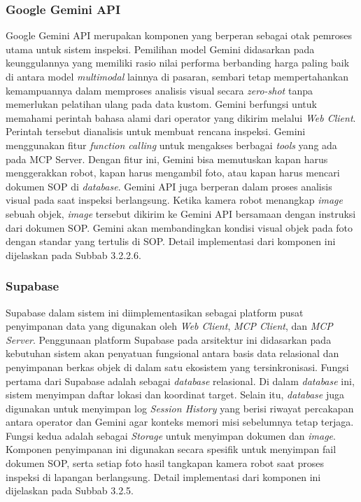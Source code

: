 \subsubsection{Google Gemini API}
Google Gemini API merupakan komponen yang berperan sebagai otak pemroses utama untuk sistem inspeksi. Pemilihan model Gemini didasarkan pada keunggulannya yang memiliki rasio nilai performa berbanding harga paling baik di antara model \textit{multimodal} lainnya di pasaran, sembari tetap mempertahankan kemampuannya dalam memproses analisis visual secara \textit{zero-shot} tanpa memerlukan pelatihan ulang pada data kustom. Gemini berfungsi untuk memahami perintah bahasa alami dari operator yang dikirim melalui \textit{Web Client}. Perintah tersebut dianalisis untuk membuat rencana inspeksi. Gemini menggunakan fitur \textit{function calling} untuk mengakses berbagai \textit{tools} yang ada pada MCP Server. Dengan fitur ini, Gemini bisa memutuskan kapan harus menggerakkan robot, kapan harus mengambil foto, atau kapan harus mencari dokumen SOP di \textit{database}. Gemini API juga berperan dalam proses analisis visual pada saat inspeksi berlangsung. Ketika kamera robot menangkap \textit{image} sebuah objek, \textit{image} tersebut dikirim ke Gemini API bersamaan dengan instruksi dari dokumen SOP. Gemini akan membandingkan kondisi visual objek pada foto dengan standar yang tertulis di SOP. Detail implementasi dari komponen ini dijelaskan pada Subbab 3.2.2.6.

\subsubsection{Supabase}
Supabase dalam sistem ini diimplementasikan sebagai platform pusat penyimpanan data yang digunakan oleh \textit{Web Client}, \textit{MCP Client}, dan \textit{MCP Server}. Penggunaan platform Supabase pada arsitektur ini didasarkan pada kebutuhan sistem akan penyatuan fungsional antara basis data relasional dan penyimpanan berkas objek di dalam satu ekosistem yang tersinkronisasi. Fungsi pertama dari Supabase adalah sebagai \textit{database} relasional. Di dalam \textit{database} ini, sistem menyimpan daftar lokasi dan koordinat target. Selain itu, \textit{database} juga digunakan untuk menyimpan log \textit{Session History} yang berisi riwayat percakapan antara operator dan Gemini agar konteks memori misi sebelumnya tetap terjaga. Fungsi kedua adalah sebagai \textit{Storage} untuk menyimpan dokumen dan \textit{image}. Komponen penyimpanan ini digunakan secara spesifik untuk menyimpan fail dokumen SOP, serta setiap foto hasil tangkapan kamera robot saat proses inspeksi di lapangan berlangsung. Detail implementasi dari komponen ini dijelaskan pada Subbab 3.2.5.

